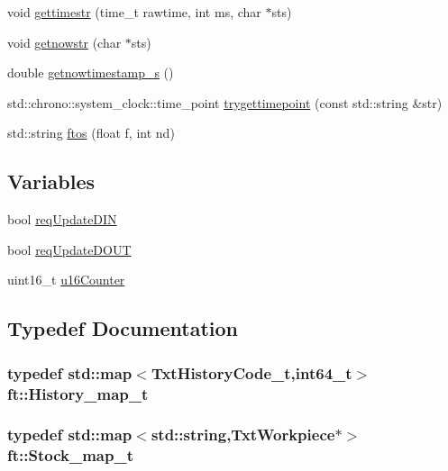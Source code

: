 \begin{DoxyCompactItemize}
\item 
void \hyperlink{namespaceft_a18781bd02fd45e167bb80b55768e016a}{gettimestr} (time\+\_\+t rawtime, int ms, char $\ast$sts)
\item 
void \hyperlink{namespaceft_ad179d0ae9ade2c2993358a1a75e2108a}{getnowstr} (char $\ast$sts)
\item 
double \hyperlink{namespaceft_acbe6c3c651c777cfa3d3cc0df4b6af45}{getnowtimestamp\+\_\+s} ()
\item 
std\+::chrono\+::system\+\_\+clock\+::time\+\_\+point \hyperlink{namespaceft_af246119b0c7594ba770d1d5df5ace3e7}{trygettimepoint} (const std\+::string \&str)
\item 
std\+::string \hyperlink{namespaceft_a15f08c980a7da83cbca0607aae189cfc}{ftos} (float f, int nd)
\end{DoxyCompactItemize}
\subsection*{Variables}
\begin{DoxyCompactItemize}
\item 
bool \hyperlink{namespaceft_ae8cc53604943aa03d3b5351851cd51b1}{req\+Update\+D\+IN}
\item 
bool \hyperlink{namespaceft_a08b5d63f2d35ec87582b89549d0cf570}{req\+Update\+D\+O\+UT}
\item 
uint16\+\_\+t \hyperlink{namespaceft_ab720d00793fdf3f12e55682541d996f4}{u16\+Counter}
\end{DoxyCompactItemize}


\subsection{Typedef Documentation}
\subsubsection[{\texorpdfstring{History\+\_\+map\+\_\+t}{History_map_t}}]{\setlength{\rightskip}{0pt plus 5cm}typedef std\+::map$<${\bf Txt\+History\+Code\+\_\+t},int64\+\_\+t$>$ {\bf ft\+::\+History\+\_\+map\+\_\+t}}\hypertarget{namespaceft_aa7740d5a5a633c96d2063e7fd135cf89}{}\label{namespaceft_aa7740d5a5a633c96d2063e7fd135cf89}
\subsubsection[{\texorpdfstring{Stock\+\_\+map\+\_\+t}{Stock_map_t}}]{\setlength{\rightskip}{0pt plus 5cm}typedef std\+::map$<$std\+::string,{\bf Txt\+Workpiece}$\ast$$>$ {\bf ft\+::\+Stock\+\_\+map\+\_\+t}}\hypertarget{namespaceft_a3d5e802a7d78dac37b288630c9b21e64}{}\label{namespaceft_a3d5e802a7d78dac37b288630c9b21e64}
